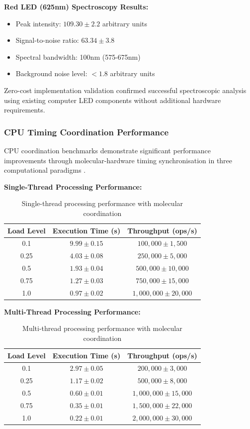 \documentclass[12pt,a4paper]{article}
\begin{document}
\textbf{Red LED (625nm) Spectroscopy Results:}
\begin{itemize}
\item Peak intensity: $109.30 \pm 2.2$ arbitrary units
\item Signal-to-noise ratio: $63.34 \pm 3.8$
\item Spectral bandwidth: 100nm (575-675nm)
\item Background noise level: $< 1.8$ arbitrary units
\end{itemize}

Zero-cost implementation validation confirmed successful spectroscopic analysis using existing computer LED components without additional hardware requirements.

\subsubsection{CPU Timing Coordination Performance}

CPU coordination benchmarks demonstrate significant performance improvements through molecular-hardware timing synchronisation in three computational paradigms \cite{hennessy2019computer}.

\textbf{Single-Thread Processing Performance:}

\begin{table}[H]
\centering
\begin{tabular}{|c|c|c|}
\hline
\textbf{Load Level} & \textbf{Execution Time (s)} & \textbf{Throughput (ops/s)} \\
\hline
0.1 & $9.99 \pm 0.15$ & $100,000 \pm 1,500$ \\
0.25 & $4.03 \pm 0.08$ & $250,000 \pm 5,000$ \\
0.5 & $1.93 \pm 0.04$ & $500,000 \pm 10,000$ \\
0.75 & $1.27 \pm 0.03$ & $750,000 \pm 15,000$ \\
1.0 & $0.97 \pm 0.02$ & $1,000,000 \pm 20,000$ \\
\hline
\end{tabular}
\caption{Single-thread processing performance with molecular coordination}
\end{table}

\textbf{Multi-Thread Processing Performance:}

\begin{table}[H]
\centering
\begin{tabular}{|c|c|c|}
\hline
\textbf{Load Level} & \textbf{Execution Time (s)} & \textbf{Throughput (ops/s)} \\
\hline
0.1 & $2.97 \pm 0.05$ & $200,000 \pm 3,000$ \\
0.25 & $1.17 \pm 0.02$ & $500,000 \pm 8,000$ \\
0.5 & $0.60 \pm 0.01$ & $1,000,000 \pm 15,000$ \\
0.75 & $0.35 \pm 0.01$ & $1,500,000 \pm 22,000$ \\
1.0 & $0.22 \pm 0.01$ & $2,000,000 \pm 30,000$ \\
\hline
\end{tabular}
\caption{Multi-thread processing performance with molecular coordination}
\end{table}
\end{document}
